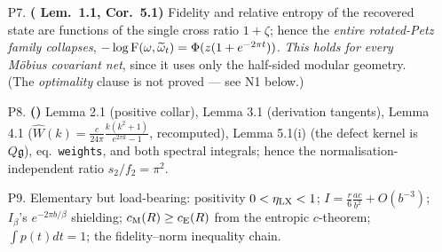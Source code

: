 \documentclass[11pt]{article}
\newcommand{\CMI}{I}
\newcommand{\zz}{\zeta}
\newcommand{\Wh}{\widehat W}
\begin{document}
\begin{enumerate}[leftmargin=1.7em]
(Thm 2.1), the relative-entropy formula (Prop.~2.2), and the second-order Bures/Kubo--Mori expansions with the weight
$[q_i(1-q_k)+q_k(1-q_i)]^{-1}=1+\cosh\frac{\kappa_i+\kappa_k}2/\cosh\frac{\kappa_i-\kappa_k}2$ (Prop.~2.3).
\item[P7.] \textbf{(\NV{} Lem.~1.1, Cor.~5.1)} Fidelity and relative entropy of the recovered state are functions of
the single cross ratio $1+\zz$; hence the \emph{entire rotated-Petz family collapses}, $-\log\operatorname{F}(\omega,\widetilde\omega_t)=\Phi(z(1+e^{-2\pi t}))$.
\emph{This holds for every M\"obius covariant net}, since it uses only the half-sided modular geometry.
(The \emph{optimality} clause is not proved --- see N1 below.)
\item[P8.] \textbf{(\NVII)} Lemma 2.1 (positive collar), Lemma 3.1 (derivation tangents), Lemma 4.1
($\Wh(k)=\frac c{24\pi}\frac{k(k^2+1)}{e^{2\pi k}-1}$, recomputed), Lemma 5.1(i) (the defect kernel is $Q\mathfrak g$),
eq.~\texttt{weights}, and both spectral integrals; hence the normalisation-independent ratio $s_2/f_2=\pi^2$.
\item[P9.] Elementary but load-bearing: positivity $0<\eta_{\rm LX}<1$; $\CMI=\frac r6\frac{ac}{b^2}+O(b^{-3})$;
$\CMI_\beta$'s $e^{-2\pi b/\beta}$ shielding; $c_{\rm M}(R)\ge c_{\rm E}(R)$ from the entropic $c$-theorem;
$\int p(t)dt=1$; the fidelity--norm inequality chain.
\end{enumerate}
\end{document}
